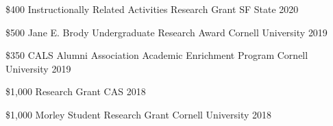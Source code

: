 



\begin{cvhonors}

  \cvhonor
    {\$400} %
    {Instructionally Related Activities Research Grant} %
    {SF State} %
    {2020} %

  \cvhonor
    {\$500} %
    {Jane E. Brody Undergraduate Research Award} %
    {Cornell University} %
    {2019} %

  \cvhonor
    {\$350} %
    {CALS Alumni Association Academic Enrichment Program} %
    {Cornell University} %
    {2019} %

  \cvhonor
    {\$1,000} %
    {Research Grant} %
    {CAS} %
    {2018} %

  \cvhonor
    {\$1,000} %
    {Morley Student Research Grant} %
    {Cornell University} %
    {2018} %

\end{cvhonors}




